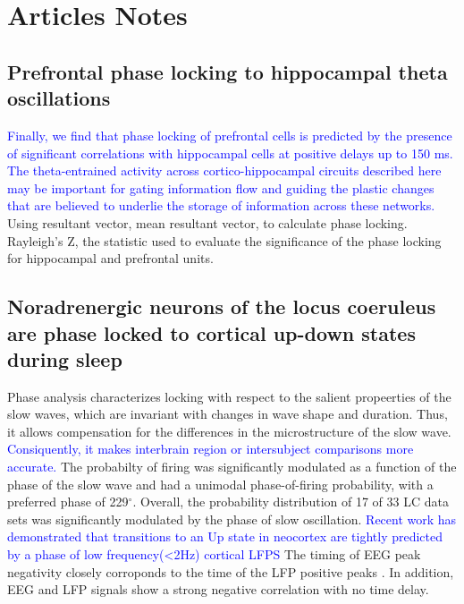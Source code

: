 \documentclass[8pt,a4paper]{article}
\begin{document}
\section*{Articles Notes}
\label{sec:Articles Notes}

\subsection*{Prefrontal phase locking to hippocampal theta oscillations}
\label{Prefrontal phase locking to hippocampal theta oscillations}
\textcolor{blue}{Finally, we find that phase locking of prefrontal cells is predicted by the presence of significant correlations with hippocampal cells at positive delays up to 150 ms.}
\textcolor{blue}{The theta-entrained activity across cortico-hippocampal circuits described here may be important for gating information flow and guiding the plastic changes that are believed to underlie the storage of information across these networks.}
Using resultant vector, mean resultant vector, to calculate phase locking. 
Rayleigh's Z, the statistic used to evaluate the significance of the phase locking for hippocampal and prefrontal units. 

\cite{siapas2005}


\subsection*{Noradrenergic neurons of the locus coeruleus are phase locked to cortical up-down states during sleep}
\label{Noradrenergic neurons of the locus coeruleus are phase locked to cortical up-down states during sleep}
Phase analysis characterizes locking with respect to the salient propeerties of the slow waves, 
which are invariant with changes in wave shape and duration. 
Thus, it allows compensation for the differences in the microstructure of the slow wave. 
\textcolor{blue}{Consiquently, it makes interbrain region or intersubject comparisons more accurate.} 
The probabilty of firing was significantly modulated as a function of the phase of the slow wave and had a unimodal phase-of-firing probability, 
with a preferred phase of 229$^{\circ}$. 
Overall, the probability distribution of 17 of 33 LC data sets was significantly modulated by the phase of slow oscillation. 
\textcolor{blue}{Recent work has demonstrated that transitions to an Up state in neocortex are tightly predicted by a phase of low frequency(<2Hz) cortical LFPS \cite{saleem2010}}
The timing of EEG peak negativity closely corroponds to the time of the LFP positive peaks \cite{eschenko2006}. 
In addition, EEG and LFP signals show a strong negative correlation with no time delay.
\cite{eschenko2012}
\end{document}

